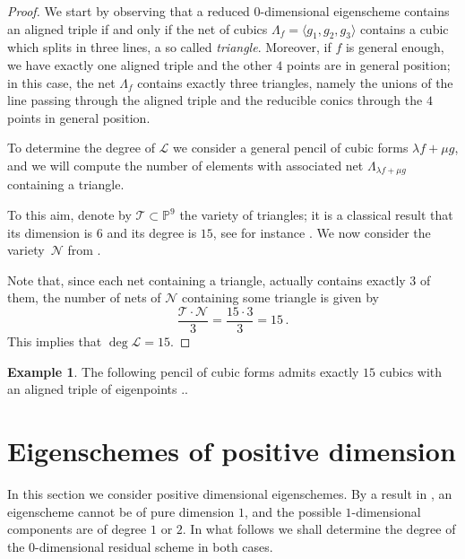\documentclass{amsart}
\theoremstyle{plain}
\theoremstyle{definition}
\newtheorem{es}[lemma]{Example}
\newcommand{\p}{\mathbb{P}}
\newcommand{\comment}[1]{}
\begin{document}
\begin{proof}
We start by observing that a reduced $0$-dimensional eigenscheme contains an aligned triple if and only if the net of cubics
$\Lambda_f = \langle g_1, g_2, g_3 \rangle$ contains a cubic which splits in three lines, a so called \emph{triangle}. Moreover, if $f$ is general enough, we have exactly one aligned triple and the other $4$ points are in general position; in this case, the net $\Lambda_f$ contains exactly three triangles, namely the unions of the line passing through the aligned triple and the reducible conics through the $4$ points in general position.

To determine the degree of $\mathcal L$ we consider a general pencil of cubic forms $\lambda f + \mu g$, and we will compute the number of elements with associated net $\Lambda_{\lambda f + \mu g}$ containing a triangle.

To this aim, denote by ${\mathcal T} \subset \p^9$ the variety of triangles; it is a classical result that its dimension is $6$ and its degree is $15$,
see for instance \cite[Section 2.2.2]{3264}. We now consider the variety~${\mathcal N}$ from .
%
%
%

%
%
%
%
%
%

Note that, since each net containing a triangle, actually contains exactly $3$ of them, the number of nets of ${\mathcal N}$ containing some triangle is given by
%
\[
\frac {{\mathcal T} \cdot {\mathcal N}}{3} =\frac{{15} \cdot {3}}{3}=15 \,.
\]
%
This implies that $\deg {\mathcal L} = 15$.
\end{proof}

\begin{es}
The following pencil of cubic forms admits exactly $15$ cubics with an aligned triple of eigenpoints ..
\end{es}


\section{Eigenschemes of positive dimension}
\label{positive_dim}

In this section we consider positive dimensional eigenschemes. By a result in \cite[...]{BGV}, an eigenscheme cannot be of pure dimension $1$, and the possible $1$-dimensional components are of degree $1$ or $2$. In what follows we shall determine the degree of the $0$-dimensional residual scheme in both cases.
\end{document}
